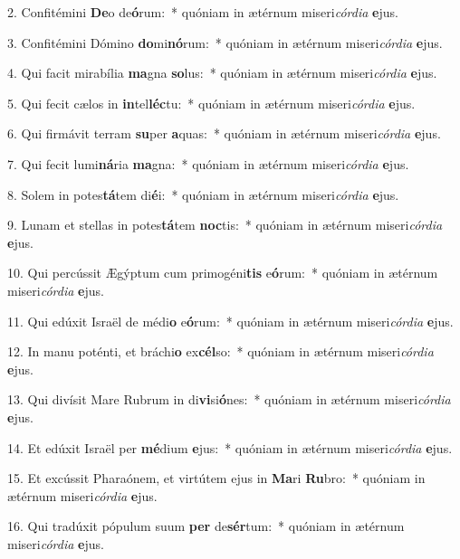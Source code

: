 2. Confitémini \textbf{De}o de\textbf{ó}rum:~*  quóniam in ætérnum miseri\textit{cór}\textit{di}\textit{a} \textbf{e}jus.\

3. Confitémini Dómino \textbf{do}mi\textbf{nó}rum:~*  quóniam in ætérnum miseri\textit{cór}\textit{di}\textit{a} \textbf{e}jus.\

4. Qui facit mirabília \textbf{ma}gna \textbf{so}lus:~*  quóniam in ætérnum miseri\textit{cór}\textit{di}\textit{a} \textbf{e}jus.\

5. Qui fecit cælos in \textbf{in}tel\textbf{léc}tu:~*  quóniam in ætérnum miseri\textit{cór}\textit{di}\textit{a} \textbf{e}jus.\

6. Qui firmávit terram \textbf{su}per \textbf{a}quas:~*  quóniam in ætérnum miseri\textit{cór}\textit{di}\textit{a} \textbf{e}jus.\

7. Qui fecit lumi\textbf{ná}ria \textbf{ma}gna:~*  quóniam in ætérnum miseri\textit{cór}\textit{di}\textit{a} \textbf{e}jus.\

8. Solem in potes\textbf{tá}tem di\textbf{é}i:~*  quóniam in ætérnum miseri\textit{cór}\textit{di}\textit{a} \textbf{e}jus.\

9. Lunam et stellas in potes\textbf{tá}tem \textbf{noc}tis:~*  quóniam in ætérnum miseri\textit{cór}\textit{di}\textit{a} \textbf{e}jus.\

10. Qui percússit Ægýptum cum primogéni\textbf{tis} e\textbf{ó}rum:~*  quóniam in ætérnum miseri\textit{cór}\textit{di}\textit{a} \textbf{e}jus.\

11. Qui edúxit Israël de médi\textbf{o} e\textbf{ó}rum:~*  quóniam in ætérnum miseri\textit{cór}\textit{di}\textit{a} \textbf{e}jus.\

12. In manu poténti, et bráchi\textbf{o} ex\textbf{cél}so:~*  quóniam in ætérnum miseri\textit{cór}\textit{di}\textit{a} \textbf{e}jus.\

13. Qui divísit Mare Rubrum in di\textbf{vi}si\textbf{ó}nes:~*  quóniam in ætérnum miseri\textit{cór}\textit{di}\textit{a} \textbf{e}jus.\

14. Et edúxit Israël per \textbf{mé}dium \textbf{e}jus:~*  quóniam in ætérnum miseri\textit{cór}\textit{di}\textit{a} \textbf{e}jus.\

15. Et excússit Pharaónem, et virtútem ejus in \textbf{Ma}ri \textbf{Ru}bro:~*  quóniam in ætérnum miseri\textit{cór}\textit{di}\textit{a} \textbf{e}jus.\

16. Qui tradúxit pópulum suum \textbf{per} de\textbf{sér}tum:~*  quóniam in ætérnum miseri\textit{cór}\textit{di}\textit{a} \textbf{e}jus.\


